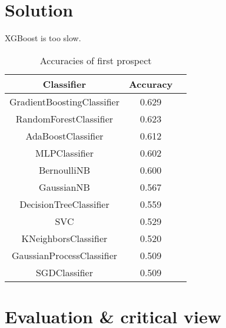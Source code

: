 \documentclass[12pt]{article}
\begin{document}
\section{Solution}
XGBoost is too slow.

\begin{table}[h!]
    \centering
    \begin{tabular}{ccc}
        \toprule
        \textbf{Classifier}        & \textbf{Accuracy} \\ \midrule
        GradientBoostingClassifier & 0.629             \\
        RandomForestClassifier     & 0.623             \\
        AdaBoostClassifier         & 0.612             \\
        MLPClassifier              & 0.602             \\
        BernoulliNB                & 0.600             \\
        GaussianNB                 & 0.567             \\
        DecisionTreeClassifier     & 0.559             \\
        SVC                        & 0.529             \\
        KNeighborsClassifier       & 0.520             \\
        GaussianProcessClassifier  & 0.509             \\
        SGDClassifier              & 0.509             \\ \bottomrule
    \end{tabular}
    \caption{Accuracies of first prospect}
\end{table}

\section{Evaluation \& critical view}
\end{document}
